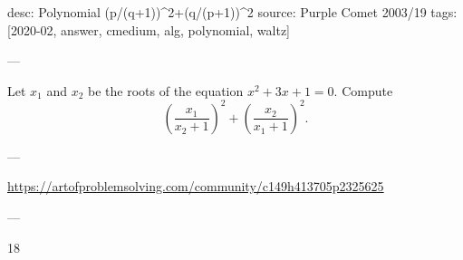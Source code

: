 desc: Polynomial (p/(q+1))^2+(q/(p+1))^2
source: Purple Comet 2003/19
tags: [2020-02, answer, cmedium, alg, polynomial, waltz]

---

Let $x_1$ and $x_2$ be the roots of the equation $x^2+3x+1=0$. Compute \[\left(\frac{x_1}{x_2+1}\right)^2+\left(\frac{x_2}{x_1+1}\right)^2.\]

---

\url{https://artofproblemsolving.com/community/c149h413705p2325625}

---

18
